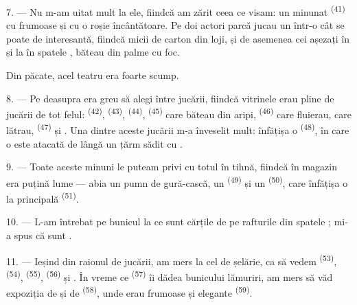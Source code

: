 7. --- Nu m-am uitat mult la ele, fiindcă am zărit ceea ce visam: un minunat
 \textsuperscript{(41)} cu  frumoase și cu
o  roșie încântătoare. Pe  doi actori parcă jucau un
 într-o  cât se poate de interesantă, fiindcă micii
 de carton din loji, și de asemenea cei așezați în 
și la  în spatele , băteau din palme cu foc.

Din păcate, acel teatru era foarte scump.

8. --- Pe deasupra era greu să alegi între jucării, fiindcă vitrinele erau pline de
jucării de tot felul:  \textsuperscript{(42)},
 \textsuperscript{(43)}, 
\textsuperscript{(44)},  \textsuperscript{(45)} care băteau din
aripi,  \textsuperscript{(46)} care fluierau,  care
lătrau,  \textsuperscript{(47)} și . Una dintre aceste jucării m-a înveselit mult: înfățișa o  \textsuperscript{(48)}, în care o  este atacată de
 lângă un țărm sădit cu .


9. --- Toate aceste minuni le puteam privi cu totul în tihnă, fiindcă în magazin era
puțină lume --- abia un pumn de gură-cască, un 
\textsuperscript{(49)} și un  \textsuperscript{(50)}, care
înfățișa o  la  principală \textsuperscript{(51)}.

10. --- L-am întrebat pe bunicul la ce sunt cărțile de pe rafturile din spatele
; mi-a spus că sunt .

\VUsaut{3.6mm}
\VUsaut{2.8mm}

11. --- Ieșind din raionul de jucării, am mers la cel de șelărie, ca să vedem
 \textsuperscript{(53)}, 
\textsuperscript{(54)},  \textsuperscript{(55)},
 \textsuperscript{(56)} și . În vreme ce
 \textsuperscript{(57)} îi dădea bunicului lămuriri, am mers
să văd expoziția de  și de 
\textsuperscript{(58)}, unde erau  frumoase și 
elegante \textsuperscript{(59)}.


